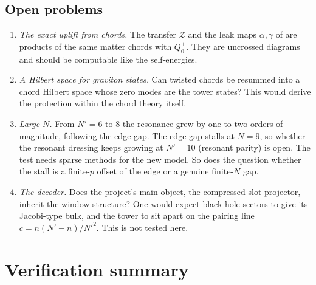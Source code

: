 \documentclass[11pt]{article}
\newcommand{\Np}{N'}
\newcommand{\Zc}{\mathcal Z}
\theoremstyle{plain}
\theoremstyle{remark}
\numberwithin{equation}{section}
\begin{document}
\subsection{Open problems}
\begin{enumerate}\itemsep2pt
\item \emph{The exact uplift from chords.} The transfer $\Zc$ and the leak maps $\alpha,\gamma$ of \cite{prog1023} are
  products of the same matter chords with $Q_0^+$. They are uncrossed diagrams and should be computable like the
  self-energies.
\item \emph{A Hilbert space for graviton states.} Can twisted chords be resummed into a chord Hilbert space whose zero
  modes are the tower states? This would derive the protection within the chord theory itself.
\item \emph{Large $N$.} From $\Np=6$ to 8 the resonance grew by one to two orders of magnitude, following the edge gap.
  The edge gap stalls at $N=9$, so whether the resonant dressing keeps growing at $\Np=10$ (resonant parity) is open.
  The test needs sparse methods for the new model. So does the question whether the stall is a finite-$p$ offset of the
  edge or a genuine finite-$N$ gap.
\item \emph{The decoder.} Does the project's main object, the compressed slot projector, inherit the window structure?
  One would expect black-hole sectors to give its Jacobi-type bulk, and the tower to sit apart on the pairing line
  $c=n(\Np-n)/\Np^2$. This is not tested here.
\end{enumerate}

\appendix

\section{Verification summary}\label{app:verify}
\end{document}
